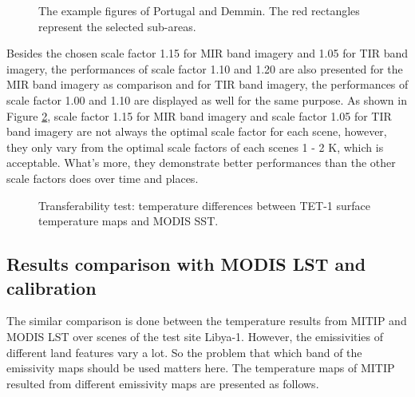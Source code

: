 \begin{figure}[!htbp]
\centering
{}
\vspace{0.5in}
\caption{The example figures of Portugal and Demmin. The red rectangles represent the selected sub-areas.}
\label{fig:portugal&demmin}
\end{figure}

\noindent Besides the chosen scale factor 1.15 for MIR band imagery and 1.05 for TIR band imagery, the performances of scale factor 1.10 and 1.20 are also presented for the MIR band imagery as comparison and for TIR band imagery, the performances of scale factor 1.00 and 1.10 are displayed as well for the same purpose. As shown in Figure \ref{fig:SST_test}, scale factor 1.15 for MIR band imagery and scale factor 1.05 for TIR band imagery are not always the optimal scale factor for each scene, however, they only vary from the optimal scale factors of each scenes 1 - 2 K, which is acceptable. What's more, they demonstrate better performances than the other scale factors does over time and places.\\

\begin{figure}[!htbp]
\centering
{}
\hspace{0.5in}
\caption{Transferability test: temperature differences between TET-1 surface temperature maps and MODIS SST.}
\label{fig:SST_test}
\end{figure}


\subsection{Results comparison with MODIS LST and calibration}
The similar comparison is done between the temperature results from MITIP and MODIS LST over scenes of the test site Libya-1. However, the emissivities of different land features vary a lot. So the problem that which band of the emissivity maps should be used matters here. The temperature maps of MITIP resulted from different emissivity maps are presented as follows.\\

